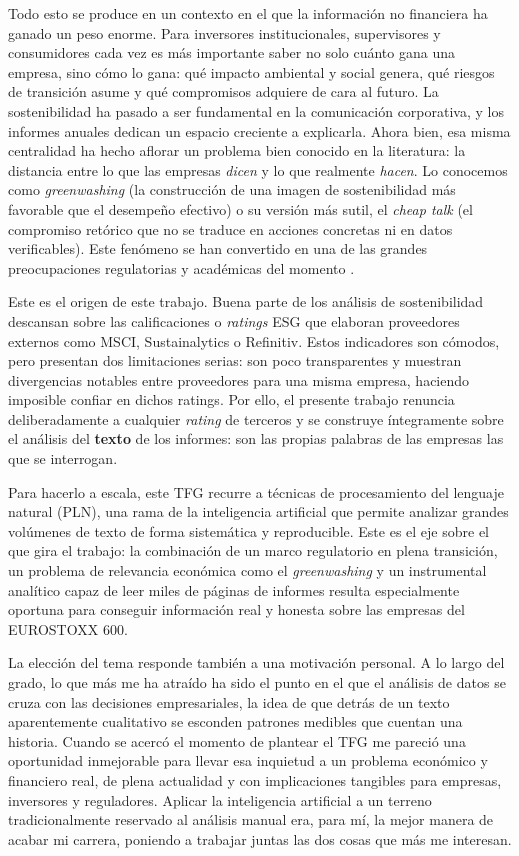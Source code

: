 Todo esto se produce en un contexto en el que la información no financiera ha
ganado un peso enorme. Para inversores institucionales, supervisores y consumidores cada vez es más 
importante saber no solo cuánto gana una empresa, sino cómo lo gana: qué impacto ambiental y
social genera, qué riesgos de transición asume y qué compromisos adquiere de cara al futuro.
La sostenibilidad ha pasado a ser fundamental en la comunicación
corporativa, y los informes anuales dedican un espacio creciente a explicarla. Ahora bien,
esa misma centralidad ha hecho aflorar un problema bien conocido en la literatura: la
distancia entre lo que las empresas \textit{dicen} y lo que realmente \textit{hacen}. Lo conocemos como
\textit{greenwashing} (la construcción de una imagen de sostenibilidad más
favorable que el desempeño efectivo) o su versión más sutil, el \textit{cheap talk}
(el compromiso retórico que no se traduce en acciones concretas ni en datos verificables). Este fenómeno
se han convertido en una de las grandes preocupaciones regulatorias y académicas del momento
\parencite{bingler2022}.

Este es el origen de este trabajo. Buena parte de los análisis de
sostenibilidad descansan sobre las calificaciones o \textit{ratings} ESG que elaboran
proveedores externos como MSCI, Sustainalytics o Refinitiv. Estos indicadores son cómodos,
pero presentan dos limitaciones serias: son poco transparentes y muestran
divergencias notables entre proveedores para una misma empresa, haciendo imposible confiar en dichos ratings.
Por ello, el presente trabajo renuncia deliberadamente a cualquier
\textit{rating} de terceros y se construye íntegramente sobre el análisis del \textbf{texto}
de los informes: son las propias palabras de las empresas las que se interrogan.

Para hacerlo a escala, este TFG recurre a técnicas de procesamiento del lenguaje natural
(PLN), una rama de la inteligencia artificial que permite analizar grandes volúmenes de
texto de forma sistemática y reproducible. Este es el eje sobre el que gira el trabajo:
la combinación de un marco regulatorio en plena transición, un problema de relevancia económica 
como el \textit{greenwashing} y un instrumental analítico capaz de leer miles de páginas de informes resulta especialmente
oportuna para conseguir información real y honesta sobre las empresas del EUROSTOXX 600.

\bigskip
La elección del tema responde también a una motivación personal. A lo largo del grado, lo
que más me ha atraído ha sido el punto en el que el análisis de datos se cruza con las
decisiones empresariales, la idea de que detrás de un texto aparentemente cualitativo
se esconden patrones medibles que cuentan una historia.
Cuando se acercó el momento de plantear el TFG me pareció una
oportunidad inmejorable para llevar esa inquietud a un problema económico y financiero real,
de plena actualidad y con implicaciones tangibles para empresas, inversores y reguladores.
Aplicar la inteligencia artificial a un terreno tradicionalmente reservado al análisis manual
era, para mí, la mejor manera de acabar mi carrera, poniendo a trabajar juntas las dos cosas que más me interesan.

